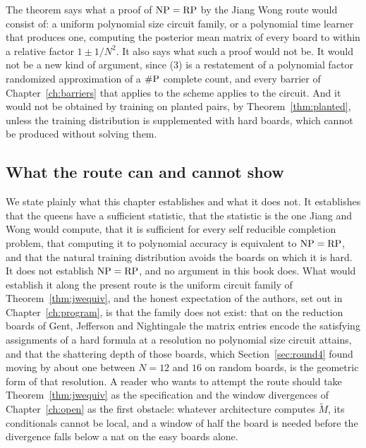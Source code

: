 The theorem says what a proof of $\mathrm{NP} = \mathrm{RP}$ by the Jiang Wong route would consist of: a uniform polynomial size circuit family, or a polynomial time learner that produces one, computing the posterior mean matrix of every board to within a relative factor $1 \pm 1/N^2$. It also says what such a proof would not be. It would not be a new kind of argument, since (3) is a restatement of a polynomial factor randomized approximation of a $\#\mathrm{P}$ complete count, and every barrier of Chapter~\ref{ch:barriers} that applies to the scheme applies to the circuit. And it would not be obtained by training on planted pairs, by Theorem~\ref{thm:planted}, unless the training distribution is supplemented with hard boards, which cannot be produced without solving them.

\subsection*{What the route can and cannot show}

We state plainly what this chapter establishes and what it does not. It establishes that the queens have a sufficient statistic, that the statistic is the one Jiang and Wong would compute, that it is sufficient for every self reducible completion problem, that computing it to polynomial accuracy is equivalent to $\mathrm{NP} = \mathrm{RP}$, and that the natural training distribution avoids the boards on which it is hard. It does not establish $\mathrm{NP} = \mathrm{RP}$, and no argument in this book does. What would establish it along the present route is the uniform circuit family of Theorem~\ref{thm:jwequiv}, and the honest expectation of the authors, set out in Chapter~\ref{ch:program}, is that the family does not exist: that on the reduction boards of Gent, Jefferson and Nightingale the matrix entries encode the satisfying assignments of a hard formula at a resolution no polynomial size circuit attains, and that the shattering depth of those boards, which Section~\ref{sec:round4} found moving by about one between $N = 12$ and $16$ on random boards, is the geometric form of that resolution. A reader who wants to attempt the route should take Theorem~\ref{thm:jwequiv} as the specification and the window divergences of Chapter~\ref{ch:open} as the first obstacle: whatever architecture computes $\tilde M$, its conditionals cannot be local, and a window of half the board is needed before the divergence falls below a nat on the easy boards alone.
